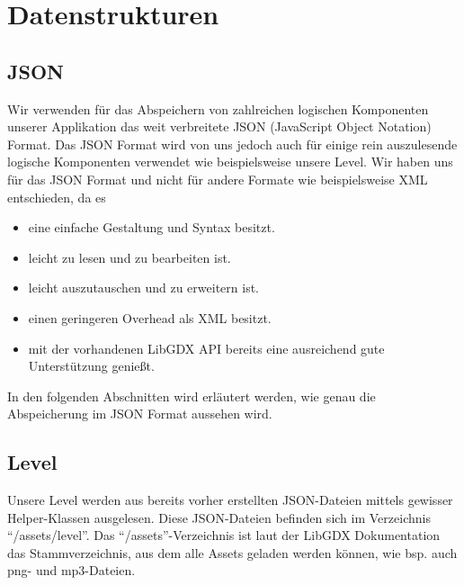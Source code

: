 \section{Datenstrukturen}

\subsection{JSON}
Wir verwenden für das Abspeichern von zahlreichen logischen Komponenten unserer Applikation das weit verbreitete JSON (JavaScript Object Notation) Format. Das JSON Format wird von uns jedoch auch für einige rein auszulesende logische Komponenten verwendet wie beispielsweise unsere Level.
Wir haben uns für das JSON Format und nicht für andere Formate wie beispielsweise XML entschieden, da es \begin{itemize}
	\item eine einfache Gestaltung und Syntax besitzt.
	\item leicht zu lesen und zu bearbeiten ist.
	\item leicht auszutauschen und zu erweitern ist.
	\item einen geringeren Overhead als XML besitzt.
	\item mit der vorhandenen LibGDX API bereits eine ausreichend gute Unterstützung genießt.
\end{itemize} 

In den folgenden Abschnitten wird erläutert werden, wie genau die Abspeicherung im JSON Format aussehen wird.

\subsection{Level}

Unsere Level werden aus bereits vorher erstellten JSON-Dateien mittels gewisser Helper-Klassen ausgelesen. Diese JSON-Dateien befinden sich im Verzeichnis "`/assets/level"'. Das "`/assets"'-Verzeichnis ist laut der LibGDX Dokumentation das Stammverzeichnis, aus dem alle Assets geladen werden können, wie bsp. auch png- und mp3-Dateien.

